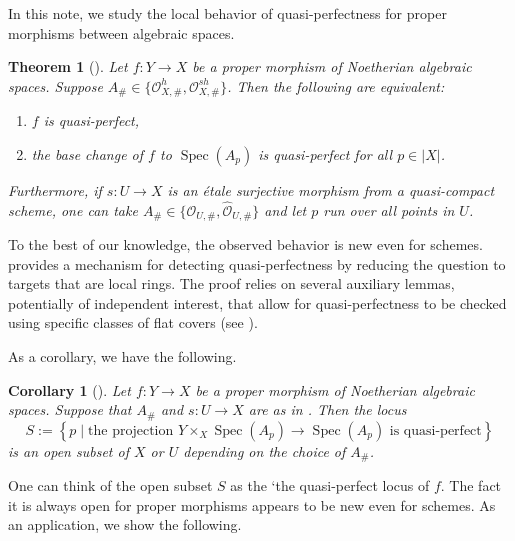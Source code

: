 \documentclass[11pt]{amsart}
\theoremstyle{plain}
\newtheorem*{theorem*}{Theorem}
\newtheorem*{corollary*}{Corollary}
\theoremstyle{definition}
\numberwithin{equation}{section}
\numberwithin{theorem}{section}
\begin{document}
In this note, we study the local behavior of quasi-perfectness for proper morphisms between algebraic spaces. 

\begin{theorem*}
    []
    Let $f\colon Y\to X$ be a proper morphism of Noetherian algebraic spaces. Suppose $A_\# \in \{\mathcal{O}_{X,\#}^h, \mathcal{O}_{X,\#}^{sh} \}$. 
    Then the following are equivalent:
    \begin{enumerate}
       \item $f$ is quasi-perfect,
       \item the base change of $f$ to $\operatorname{Spec}(A_p)$ is quasi-perfect for all $p \in |X|$.
    \end{enumerate}
    Furthermore, if $s\colon U\to X$ is an \'{e}tale surjective morphism from a quasi-compact scheme, one can take $A_\# \in \{ \mathcal{O}_{U,\#}, \widehat{\mathcal{O}}_{U,\#}\}$
    and let $p$ run over all points in $U$.
\end{theorem*}

To the best of our knowledge, the observed behavior is new even for schemes.  provides a mechanism for detecting quasi-perfectness by reducing the question to targets that are local rings. 
The proof relies on several auxiliary lemmas, potentially of independent interest, that allow for quasi-perfectness to be checked using specific classes of flat covers (see ).

As a corollary, we have the following.

\begin{corollary*}
    []
    Let $f\colon Y\to X$ be a proper morphism of Noetherian algebraic spaces. Suppose that $A_\#$ and $s\colon U\to X$ are as in . Then the locus
    \begin{displaymath}
        S:=\left\{ p \mid \text{the projection } Y\times_X \operatorname{Spec}(A_p)\to \operatorname{Spec}(A_p) \textrm{ is quasi-perfect}\right\}
    \end{displaymath}
    is an open subset of $X$ or $U$ depending on the choice of $A_\#$. 
\end{corollary*}

One can think of the open subset $S$ as the `the quasi-perfect locus of $f$.
The fact it is always open for proper morphisms appears to be new even for schemes. As an application, we show the following.
\end{document}

